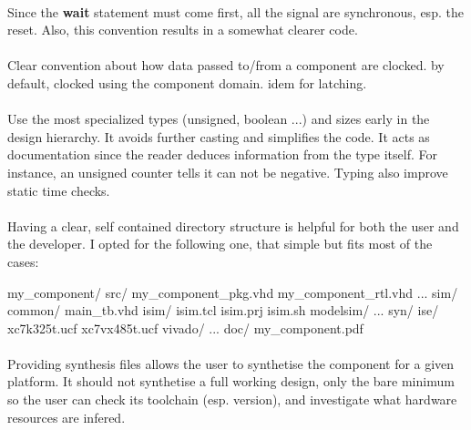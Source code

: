 \documentclass[12pt]{article}
\begin{document}
\paragraph{}
Since the \textbf{wait} statement must come first, all the signal
are synchronous, esp. the reset. Also, this convention results in
a somewhat clearer code.



\paragraph{}
Clear convention about how data passed to/from a component are
clocked. by default, clocked using the component domain. idem for
latching.



\paragraph{}
Use the most specialized types (unsigned, boolean ...) and sizes
early in the design hierarchy. It avoids further casting and
simplifies the code. It acts as documentation since the reader
deduces information from the type itself. For instance, an
unsigned counter tells it can not be negative. Typing also
improve static time checks.



\paragraph{}
Having a clear, self contained directory structure is helpful
for both the user and the developer. I opted for the following
one, that simple but fits most of the cases:
\begin{sh}
my_component/
 src/
  my_component_pkg.vhd
  my_component_rtl.vhd
  ...
 sim/
  common/
   main_tb.vhd
  isim/
   isim.tcl
   isim.prj
   isim.sh
  modelsim/
   ...
 syn/
  ise/
   xc7k325t.ucf
   xc7vx485t.ucf
  vivado/
   ...
 doc/
  my_component.pdf
\end{sh}

\paragraph{}
Providing synthesis files allows the user to synthetise the
component for a given platform. It should not synthetise a full
working design, only the bare minimum so the user can check its
toolchain (esp. version), and investigate what hardware resources
are infered.


\end{document}
